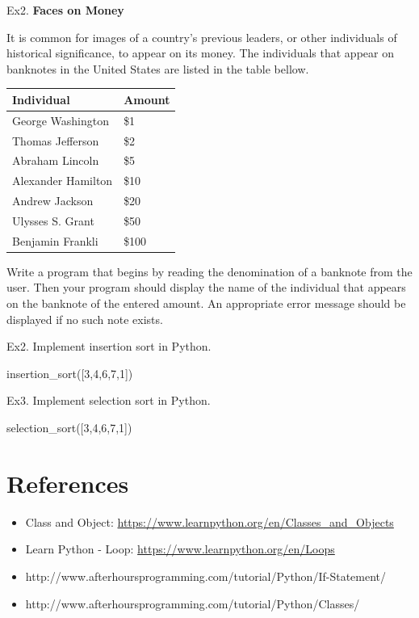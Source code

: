 \documentclass[11pt]{article}
\providecommand{\tightlist}{%
      \setlength{\itemsep}{0pt}\setlength{\parskip}{0pt}}
\newenvironment{Shaded}{}{}
\newcommand{\DecValTok}[1]{\textcolor[rgb]{0.25,0.63,0.44}{{#1}}}
\newcommand{\NormalTok}[1]{{#1}}
\begin{document}
    Ex2. \textbf{Faces on Money}

It is common for images of a country's previous leaders, or other
individuals of historical significance, to appear on its money. The
individuals that appear on banknotes in the United States are listed in
the table bellow.

\begin{longtable}[]{@{}ll@{}}
\toprule
Individual & Amount\tabularnewline
\midrule
\endhead
George Washington & \$1\tabularnewline
Thomas Jefferson & \$2\tabularnewline
Abraham Lincoln & \$5\tabularnewline
Alexander Hamilton & \$10\tabularnewline
Andrew Jackson & \$20\tabularnewline
Ulysses S. Grant & \$50\tabularnewline
Benjamin Frankli & \$100\tabularnewline
\bottomrule
\end{longtable}

Write a program that begins by reading the denomination of a banknote
from the user. Then your program should display the name of the
individual that appears on the banknote of the entered amount. An
appropriate error message should be displayed if no such note exists.

    Ex2. Implement insertion sort in Python.

\begin{Shaded}
\begin{Highlighting}[]
\NormalTok{insertion_sort([}\DecValTok{3}\NormalTok{,}\DecValTok{4}\NormalTok{,}\DecValTok{6}\NormalTok{,}\DecValTok{7}\NormalTok{,}\DecValTok{1}\NormalTok{])}
\end{Highlighting}
\end{Shaded}

    Ex3. Implement selection sort in Python.

\begin{Shaded}
\begin{Highlighting}[]
\NormalTok{selection_sort([}\DecValTok{3}\NormalTok{,}\DecValTok{4}\NormalTok{,}\DecValTok{6}\NormalTok{,}\DecValTok{7}\NormalTok{,}\DecValTok{1}\NormalTok{])}
\end{Highlighting}
\end{Shaded}

    \section{References}\label{references}

\begin{itemize}
\tightlist
\item
  Class and Object:
  \url{https://www.learnpython.org/en/Classes_and_Objects}
\item
  Learn Python - Loop: \url{https://www.learnpython.org/en/Loops}
\item
  http://www.afterhoursprogramming.com/tutorial/Python/If-Statement/
\item
  http://www.afterhoursprogramming.com/tutorial/Python/Classes/
\end{itemize}


    
    
    
    
\end{document}
